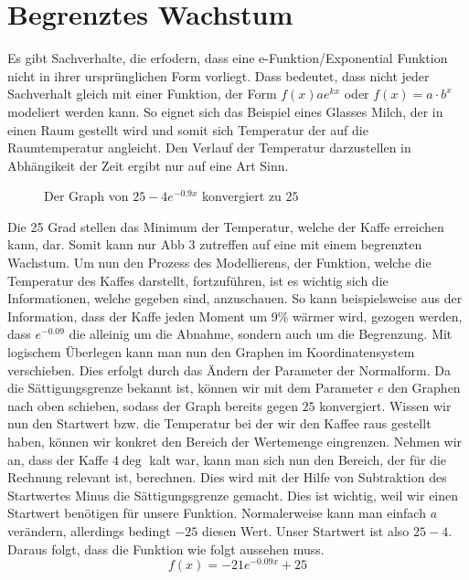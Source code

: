 \section{Begrenztes Wachstum}
Es gibt Sachverhalte, die erfodern, dass eine e-Funktion/Exponential Funktion nicht in ihrer ursprünglichen Form vorliegt. Dass bedeutet, dass nicht jeder Sachverhalt gleich mit einer Funktion, der Form $f(x)ae^{kx}$ oder $f(x)=a\cdot b^x$ modeliert werden kann. So eignet sich das  Beispiel eines Glasses Milch, der in einen Raum gestellt wird und somit sich Temperatur der auf die Raumtemperatur angleicht. Den Verlauf der Temperatur darzustellen in Abhängikeit der Zeit ergibt nur auf eine Art Sinn.
\begin{figure}[h]
\centering
	\caption{Der Graph von $25-4e^{-0.9x}$ konvergiert zu $25$}
\end{figure}
Die 25 Grad stellen das Minimum der Temperatur, welche der Kaffe erreichen kann, dar. Somit kann nur Abb 3 zutreffen auf eine mit einem begrenzten Wachstum. Um nun den Prozess des Modellierens, der Funktion, welche die Temperatur des Kaffes darstellt, fortzuführen, ist es wichtig sich die Informationen, welche gegeben sind, anzuschauen. So kann beispielsweise aus der Information, dass der Kaffe jeden Moment um 9\% wärmer wird, gezogen werden, dass $e^{-0.09}$ die alleinig um die Abnahme, sondern auch um die Begrenzung. Mit logischem Überlegen kann man nun den Graphen im Koordinatensystem verschieben. Dies erfolgt durch das Ändern der Parameter der Normalform. Da die Sättigungsgrenze bekannt ist, können wir mit dem Parameter $e$ den Graphen nach oben schieben, sodass der Graph bereits gegen $25$ konvergiert. Wissen wir nun den Startwert bzw. die Temperatur bei der wir den Kaffee raus gestellt haben, können wir konkret den Bereich der Wertemenge eingrenzen. Nehmen wir an, dass der Kaffe $4\deg$ kalt war, kann man sich nun den Bereich, der für die Rechnung relevant ist, berechnen. Dies wird mit der Hilfe von Subtraktion des Startwertes Minus die Sättigungsgrenze gemacht. Dies ist wichtig, weil wir einen Startwert benötigen für unsere Funktion. Normalerweise kann man einfach $a$ verändern, allerdings bedingt $-25$ diesen Wert. Unser Startwert ist also $25-4$. Daraus folgt, dass die Funktion wie folgt aussehen muss. \[f(x)=-21e^{-0.09x}+25\]
\pagebreak